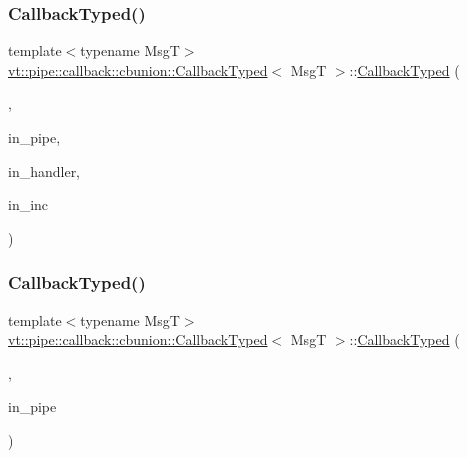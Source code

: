 \subsubsection{\texorpdfstring{Callback\+Typed()}{CallbackTyped()}\hspace{0.1cm}{\footnotesize\ttfamily [5/14]}}
{\footnotesize\ttfamily template$<$typename MsgT$>$ \\
\hyperlink{structvt_1_1pipe_1_1callback_1_1cbunion_1_1_callback_typed}{vt\+::pipe\+::callback\+::cbunion\+::\+Callback\+Typed}$<$ MsgT $>$\+::\hyperlink{structvt_1_1pipe_1_1callback_1_1cbunion_1_1_callback_typed}{Callback\+Typed} (\begin{DoxyParamCaption}\item[{Raw\+Bcast\+Msg\+Tag\+Type}]{,  }\item[{\hyperlink{namespacevt_ac9852acda74d1896f48f406cd72c7bd3}{Pipe\+Type} const \&}]{in\+\_\+pipe,  }\item[{\hyperlink{namespacevt_af64846b57dfcaf104da3ef6967917573}{Handler\+Type} const \&}]{in\+\_\+handler,  }\item[{bool const \&}]{in\+\_\+inc }\end{DoxyParamCaption})\hspace{0.3cm}{\ttfamily [inline]}}

\mbox{\label{structvt_1_1pipe_1_1callback_1_1cbunion_1_1_callback_typed_ac017bd9d99b889d882acb7e9847d0378}} 
\subsubsection{\texorpdfstring{Callback\+Typed()}{CallbackTyped()}\hspace{0.1cm}{\footnotesize\ttfamily [6/14]}}
{\footnotesize\ttfamily template$<$typename MsgT$>$ \\
\hyperlink{structvt_1_1pipe_1_1callback_1_1cbunion_1_1_callback_typed}{vt\+::pipe\+::callback\+::cbunion\+::\+Callback\+Typed}$<$ MsgT $>$\+::\hyperlink{structvt_1_1pipe_1_1callback_1_1cbunion_1_1_callback_typed}{Callback\+Typed} (\begin{DoxyParamCaption}\item[{Raw\+Anon\+Tag\+Type}]{,  }\item[{\hyperlink{namespacevt_ac9852acda74d1896f48f406cd72c7bd3}{Pipe\+Type} const \&}]{in\+\_\+pipe }\end{DoxyParamCaption})\hspace{0.3cm}{\ttfamily [inline]}}

